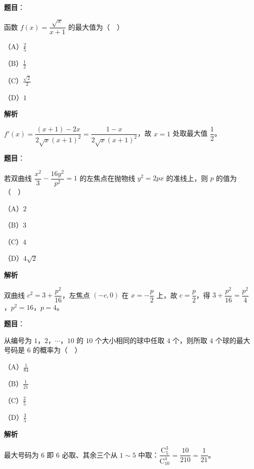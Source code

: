 \begin{answer}

\textbf{题目}：

函数 $f(x)=\dfrac{\sqrt x}{x+1}$ 的最大值为（　）

（A）$\frac25$

（B）$\frac12$

（C）$\frac{\sqrt2}2$

（D）$1$

\textbf{解析}

$f'(x)=\dfrac{(x+1)-2x}{2\sqrt x(x+1)^2}=\dfrac{1-x}{2\sqrt x(x+1)^2}$，故 $x=1$ 处取最大值 $\dfrac12$。


\end{answer}
\begin{answer}

\textbf{题目}：

若双曲线 $\dfrac{x^2}3-\dfrac{16y^2}{p^2}=1$ 的左焦点在抛物线 $y^2=2px$ 的准线上，则 $p$ 的值为（　）

（A）$2$

（B）$3$

（C）$4$

（D）$4\sqrt2$

\textbf{解析}

双曲线 $c^2=3+\dfrac{p^2}{16}$，左焦点 $\left(-c,0\right)$ 在 $x=-\dfrac p2$ 上，故 $c=\dfrac p2$，得 $3+\dfrac{p^2}{16}=\dfrac{p^2}4$，$p^2=16$，$p=4$。


\end{answer}
\begin{answer}

\textbf{题目}：

从编号为 $1$，$2$，$\cdots$，$10$ 的 $10$ 个大小相同的球中任取 $4$ 个，则所取 $4$ 个球的最大号码是 $6$ 的概率为（　）

（A）$\frac1{84}$

（B）$\frac1{21}$

（C）$\frac25$

（D）$\frac35$

\textbf{解析}

最大号码为 $6$ 即 $6$ 必取、其余三个从 $1\sim5$ 中取：$\dfrac{\mathrm C_5^3}{\mathrm C_{10}^4}=\dfrac{10}{210}=\dfrac1{21}$。


\end{answer}
